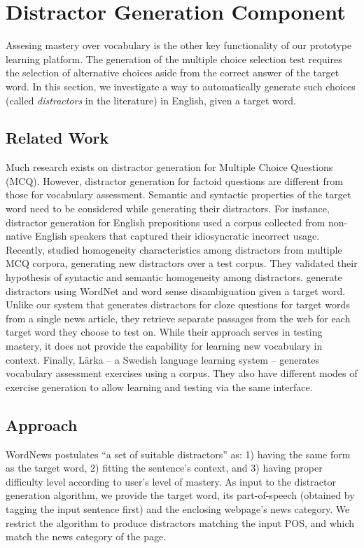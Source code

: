 \section{Distractor Generation Component}
\label{sec:distractor}

Assesing mastery over vocabulary is the other key functionality of our
prototype learning platform.  The generation of the multiple choice
selection test requires the selection of alternative choices aside
from the correct answer of the target word.  In this section, we
investigate a way to automatically generate such choices (called {\it
  distractors} in the literature) in English, given a target word.

\subsection{Related Work}
Much research exists on distractor generation for Multiple Choice
Questions (MCQ).  However, distractor generation for factoid questions
are different from those for vocabulary assessment. Semantic and
syntactic properties of the target word need to be considered while
generating their distractors.  For instance, distractor generation for
English prepositions \cite{lee2007} used a corpus collected from
non-native English speakers that captured their idiosyncratic
incorrect usage. Recently, \cite{pho2014multiple} studied homogeneity
characteristics among distractors from multiple MCQ corpora,
generating new distractors over a test corpus. They validated their
hypothesis of syntactic and semantic homogeneity among
distractors. \cite{susanti2015} generate distractors using WordNet and
word sense disambiguation given a target word.  Unlike our system that
generates distractors for cloze questions for target words from a
single news article, they retrieve separate passages from the web for
each target word they choose to test on. While their approach serves
in testing mastery, it does not provide the capability for learning
new vocabulary in context.  Finally, L{\"a}rka \cite{volodina2014} --
a Swedish language learning system -- generates vocabulary assessment
exercises using a corpus. They also have different modes of exercise
generation to allow learning and testing via the same interface.

\subsection{Approach}
WordNews postulates ``a set of suitable distractors'' as: 1) having
the same form as the target word, 2) fitting the sentence's context,
and 3) having proper difficulty level according to user's level of
mastery.
As input to the distractor generation algorithm, we provide the target
word, its part-of-speech (obtained by tagging the input sentence
first) and the enclosing webpage's news category. We restrict the
algorithm to produce distractors matching the input POS, and which
match the news category of the page.

